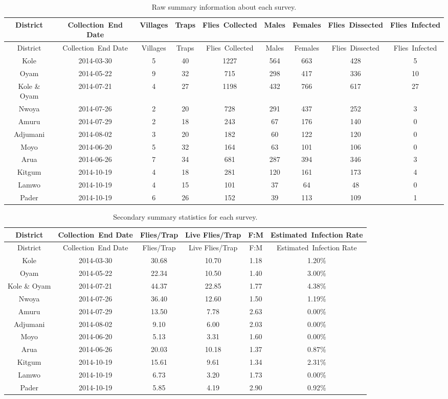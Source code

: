 \documentclass[letterpaper]{report}
\date{}
\begin{document}
\begin{longtable}[c]{@{}ccccccccc@{}}
\caption{Raw summary information about each survey.}\tabularnewline
\toprule
District & Collection~End Date & Villages & Traps & Flies~Collected &
Males & Females & Flies~Dissected & Flies~Infected\tabularnewline
\midrule
\endfirsthead
\toprule
District & Collection~End Date & Villages & Traps & Flies~Collected &
Males & Females & Flies~Dissected & Flies~Infected\tabularnewline
\midrule
\endhead
Kole & 2014-03-30 & 5 & 40 & 1227 & 564 & 663 & 428 & 5\tabularnewline
Oyam & 2014-05-22 & 9 & 32 & 715 & 298 & 417 & 336 & 10\tabularnewline
Kole \& Oyam & 2014-07-21 & 4 & 27 & 1198 & 432 & 766 & 617 &
27\tabularnewline
Nwoya & 2014-07-26 & 2 & 20 & 728 & 291 & 437 & 252 & 3\tabularnewline
Amuru & 2014-07-29 & 2 & 18 & 243 & 67 & 176 & 140 & 0\tabularnewline
Adjumani & 2014-08-02 & 3 & 20 & 182 & 60 & 122 & 120 & 0\tabularnewline
Moyo & 2014-06-20 & 5 & 32 & 164 & 63 & 101 & 106 & 0\tabularnewline
Arua & 2014-06-26 & 7 & 34 & 681 & 287 & 394 & 346 & 3\tabularnewline
Kitgum & 2014-10-19 & 4 & 18 & 281 & 120 & 161 & 173 & 4\tabularnewline
Lamwo & 2014-10-19 & 4 & 15 & 101 & 37 & 64 & 48 & 0\tabularnewline
Pader & 2014-10-19 & 6 & 26 & 152 & 39 & 113 & 109 & 1\tabularnewline
\bottomrule
\end{longtable}

\begin{longtable}[c]{@{}cccccc@{}}
\caption{Secondary summary statistics for each survey.}\tabularnewline
\toprule
District & Collection~End Date & Flies/Trap & Live Flies/Trap & F:M &
Estimated~Infection Rate\tabularnewline
\midrule
\endfirsthead
\toprule
District & Collection~End Date & Flies/Trap & Live Flies/Trap & F:M &
Estimated~Infection Rate\tabularnewline
\midrule
\endhead
Kole & 2014-03-30 & 30.68 & 10.70 & 1.18 & 1.20\%\tabularnewline
Oyam & 2014-05-22 & 22.34 & 10.50 & 1.40 & 3.00\%\tabularnewline
Kole \& Oyam & 2014-07-21 & 44.37 & 22.85 & 1.77 & 4.38\%\tabularnewline
Nwoya & 2014-07-26 & 36.40 & 12.60 & 1.50 & 1.19\%\tabularnewline
Amuru & 2014-07-29 & 13.50 & 7.78 & 2.63 & 0.00\%\tabularnewline
Adjumani & 2014-08-02 & 9.10 & 6.00 & 2.03 & 0.00\%\tabularnewline
Moyo & 2014-06-20 & 5.13 & 3.31 & 1.60 & 0.00\%\tabularnewline
Arua & 2014-06-26 & 20.03 & 10.18 & 1.37 & 0.87\%\tabularnewline
Kitgum & 2014-10-19 & 15.61 & 9.61 & 1.34 & 2.31\%\tabularnewline
Lamwo & 2014-10-19 & 6.73 & 3.20 & 1.73 & 0.00\%\tabularnewline
Pader & 2014-10-19 & 5.85 & 4.19 & 2.90 & 0.92\%\tabularnewline
\bottomrule
\end{longtable}
\end{document}
